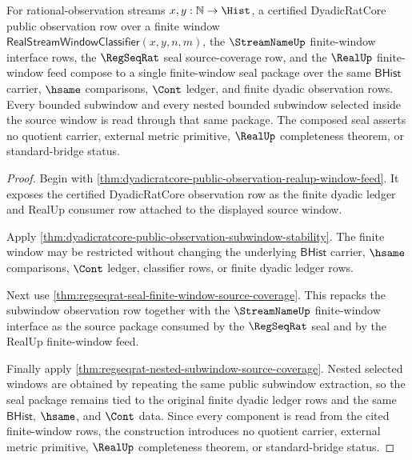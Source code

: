 \begin{theorem}
\label{thm:regseqrat-finite-window-seal-composition}
For rational-observation streams $x,y:\mathbb{N}\to\Hist$, a certified
DyadicRatCore public observation row over a finite window
$\mathsf{RealStreamWindowClassifier}(x,y,n,m)$, the $\StreamNameUp$
finite-window interface rows, the $\RegSeqRat$ seal source-coverage row, and
the $\RealUp$ finite-window feed compose to a single finite-window seal package
over the same $\mathsf{BHist}$ carrier, $\hsame$ comparisons, $\Cont$ ledger,
and finite dyadic observation rows. Every bounded subwindow and every nested
bounded subwindow selected inside the source window is read through that same
package. The composed seal asserts no quotient carrier, external metric
primitive, $\RealUp$ completeness theorem, or standard-bridge status.
\end{theorem}
\begin{proof}
Begin with
\autoref{thm:dyadicratcore-public-observation-realup-window-feed}. It exposes
the certified DyadicRatCore observation row as the finite dyadic ledger and
RealUp consumer row attached to the displayed source window.

Apply
\autoref{thm:dyadicratcore-public-observation-subwindow-stability}. The finite
window may be restricted without changing the underlying $\mathsf{BHist}$
carrier, $\hsame$ comparisons, $\Cont$ ledger, classifier rows, or finite dyadic
ledger rows.

Next use
\autoref{thm:regseqrat-seal-finite-window-source-coverage}. This repacks the
subwindow observation row together with the $\StreamNameUp$ finite-window
interface as the source package consumed by the $\RegSeqRat$ seal and by the
RealUp finite-window feed.

Finally apply
\autoref{thm:regseqrat-nested-subwindow-source-coverage}. Nested selected
windows are obtained by repeating the same public subwindow extraction, so the
seal package remains tied to the original finite dyadic ledger rows and the
same $\mathsf{BHist}$, $\hsame$, and $\Cont$ data. Since every component is read
from the cited finite-window rows, the construction introduces no quotient
carrier, external metric primitive, $\RealUp$ completeness theorem, or
standard-bridge status.
\end{proof}

